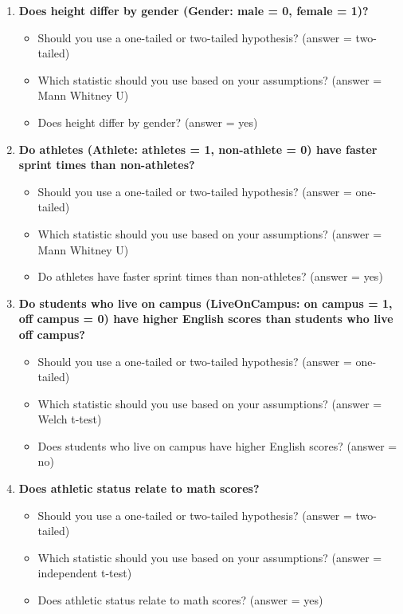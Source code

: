 \documentclass[
]{book}
\begin{document}
\begin{enumerate}
\def\labelenumi{\arabic{enumi}.}
\item
  \textbf{Does height differ by gender (Gender: male = 0, female = 1)?}

  \begin{itemize}
  \item
    Should you use a one-tailed or two-tailed hypothesis? (answer = two-tailed)
  \item
    Which statistic should you use based on your assumptions? (answer = Mann Whitney U)
  \item
    Does height differ by gender? (answer = yes)
  \end{itemize}
\item
  \textbf{Do athletes (Athlete: athletes = 1, non-athlete = 0) have faster sprint times than non-athletes?}

  \begin{itemize}
  \item
    Should you use a one-tailed or two-tailed hypothesis? (answer = one-tailed)
  \item
    Which statistic should you use based on your assumptions? (answer = Mann Whitney U)
  \item
    Do athletes have faster sprint times than non-athletes? (answer = yes)
  \end{itemize}
\item
  \textbf{Do students who live on campus (LiveOnCampus: on campus = 1, off campus = 0) have higher English scores than students who live off campus?}

  \begin{itemize}
  \item
    Should you use a one-tailed or two-tailed hypothesis? (answer = one-tailed)
  \item
    Which statistic should you use based on your assumptions? (answer = Welch t-test)
  \item
    Does students who live on campus have higher English scores? (answer = no)
  \end{itemize}
\item
  \textbf{Does athletic status relate to math scores?}

  \begin{itemize}
  \item
    Should you use a one-tailed or two-tailed hypothesis? (answer = two-tailed)
  \item
    Which statistic should you use based on your assumptions? (answer = independent t-test)
  \item
    Does athletic status relate to math scores? (answer = yes)
  \end{itemize}
\end{enumerate}
\end{document}
